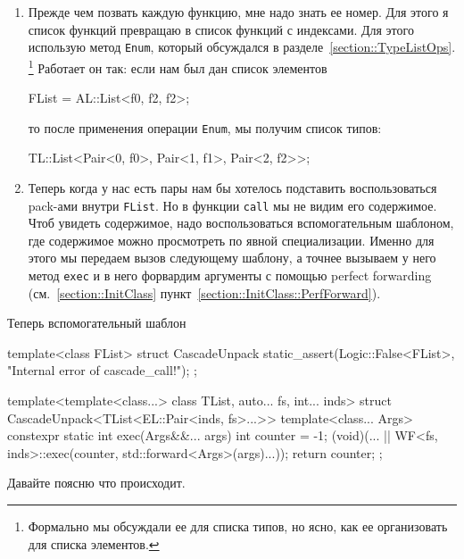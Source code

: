 \begin{enumerate}
\item Прежде чем позвать каждую функцию, мне надо знать ее номер.
Для этого я  список функций превращаю в список функций с индексами.
Для этого использую метод \verb"Enum", который обсуждался в разделе~\ref{section::TypeListOps}.%
\footnote{Формально мы обсуждали ее для списка типов, но ясно, как ее организовать для списка элементов.}
Работает он так: если нам был дан список элементов
\begin{cppcode}[\nonumbers]
FList = AL::List<f0, f2, f2>;
\end{cppcode}
то после применения операции \verb"Enum", мы получим список типов:
\begin{cppcode}
TL::List<Pair<0, f0>, Pair<1, f1>, Pair<2, f2>>;
\end{cppcode}

\item Теперь когда у нас есть пары нам бы хотелось подставить воспользоваться pack-ами внутри \verb"FList".
Но в функции \verb"call" мы не видим его содержимое.
Чтоб увидеть содержимое, надо воспользоваться вспомогательным шаблоном, где содержимое можно просмотреть по явной специализации.
Именно для этого мы передаем вызов следующему шаблону, а точнее вызываем у него метод \verb"exec" и в него форвардим аргументы с помощью perfect forwarding (см.~\ref{section::InitClass} пункт~\ref{section::InitClass::PerfForward}).
\end{enumerate}
Теперь вспомогательный шаблон
\begin{cppcode}

template<class FList>
struct CascadeUnpack {
  static_assert(Logic::False<FList>, "Internal error of cascade_call!");
};

template<template<class...> class TList, auto... fs, int... inds>
struct CascadeUnpack<TList<EL::Pair<inds, fs>...>> {
  template<class... Args>
  constexpr static int exec(Args&&... args) {
    int counter = -1;
    (void)(... || WF<fs, inds>::exec(counter, std::forward<Args>(args)...));
    return counter;
  }
};
\end{cppcode}
Давайте поясню что происходит.
